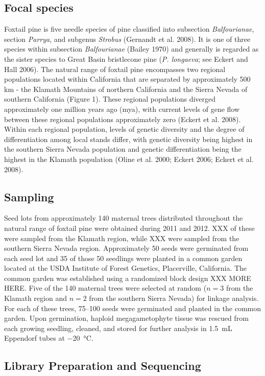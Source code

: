 \documentclass[11pt]{article}
\begin{document}
\subsection{Focal species}
Foxtail pine is five needle species of pine classified into 
subsection \textit{Balfourianae}, section \textit{Parrya}, and subgenus \textit{Strobus} 
(Gernandt et al. 2008). It is one of three species within subsection \textit{Balfourianae} 
(Bailey 1970) and generally is regarded as the sister species to Great Basin bristlecone pine (\textit{P. longaeva}; see 
Eckert and Hall 2006). The natural range of foxtail pine encompasses two 
regional populations located within California that are separated by approximately 500 km - 
the Klamath Mountains of northern California and the Sierra Nevada of southern California 
(Figure 1). These regional populations diverged approximately one million years ago (mya), 
with current levels of gene flow between these regional populations approximately zero 
(Eckert et al. 2008). Within each regional population, levels of genetic diversity and the 
degree of differentiation among local stands differ, with genetic diversity being highest in 
the southern Sierra Nevada population and genetic differentiation being the highest in the 
Klamath population (Oline et al. 2000; Eckert 2006; Eckert et al. 2008).

\subsection{Sampling}
Seed lots from approximately 140 maternal trees distributed throughout the natural range 
of foxtail pine were obtained during 2011 and 2012. XXX of these were sampled from the 
Klamath region, while XXX were sampled from the southern Sierra Nevada region. Approximately 
50 seeds were germinated from each seed lot and 35 of those 50 seedlings were planted in a 
common garden located at the USDA Institute of Forest Genetics, Placerville, California. The 
common garden was established using a randomized block design XXX MORE HERE. Five of the 
140 maternal trees were selected at random ($n = 3$ from the Klamath region and $n = 2$ from 
the southern Sierra Nevada) for linkage analysis. For each of these trees, \SIrange{75}{100}{} 
seeds were germinated and planted in the common garden. Upon germination, haploid 
megagametophyte tissue was rescued from each growing seedling, cleaned, and stored for further 
analysis in \SI{1.5}{\mL} Eppendorf tubes at \SI{-20}{\celsius}.


\subsection{Library Preparation and Sequencing}
\end{document}
